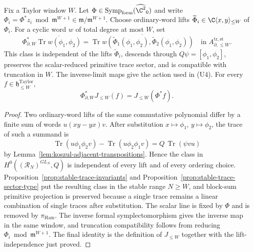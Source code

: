 \documentclass[11pt]{memoir}
\begin{document}
\begin{lem}
\label{lem:formal-darboux-action-trace-sector}
  Fix a Taylor window \(W\).  Let
  \(\Phi\in\operatorname{Symp}_{\mathrm{form}}(\widehat{\C^2}_0)\)
  and write
  \(\Phi_i=\Phi^*z_i\bmod\mathfrak m^{W+1}\in
  \mathfrak m/\mathfrak m^{W+1}\).  Choose ordinary-word lifts
  \(\widetilde\Phi_i\in\C\langle x,y\rangle_{\le W}\) of
  \(\Phi_i\).  For a cyclic word \(w\) of total degree at most \(W\),
  set
  \[
    \Phi^*_{\partial,W}
    \overline{\operatorname{Tr}w(\phi_1,\phi_2)}
    =
    \overline{\operatorname{Tr}
      w(\widetilde\Phi_1(\phi_1,\phi_2),
        \widetilde\Phi_2(\phi_1,\phi_2))}
      \quad \text{in }
      A_{\partial,\le W}^{\mathrm{tr,st}} .
  \]
  This class is independent of the lifts \(\widetilde\Phi_i\), descends
  through \(Q\psi=[\phi_1,\phi_2]\), preserves the scalar-reduced
  primitive trace sector, and is compatible with truncation in \(W\).
  The inverse-limit maps give the action used in \textup{(U4)}.  For
  every \(f\in\mathfrak h^{\mathrm{Taylor}}_{\le W}\),
  \[
    \Phi^*_{\partial,W}J_{\le W}(f)=J_{\le W}(\Phi^*f).
  \]
\end{lem}

\begin{proof}
  Two ordinary-word lifts of the same commutative polynomial differ by a
  finite sum of words \(u(xy-yx)v\).  After substitution
  \(x\mapsto\phi_1\), \(y\mapsto\phi_2\), the trace of such a summand is
  \[
    \operatorname{Tr}(u\phi_1\phi_2v)
    -\operatorname{Tr}(u\phi_2\phi_1v)
    =
    Q\,\operatorname{Tr}(\psi vu)
  \]
  by Lemma~\ref{lem:koszul-adjacent-transpositions}.  Hence the class in
  \(H^0((\mathcal R_N)^{GL_N},Q)\) is independent of every lift and of
  every ordering choice.  Proposition~\ref{prop:stable-trace-invariants}
  and Proposition~\ref{prop:stable-trace-sector-type} put the resulting
  class in the stable range \(N\ge W\), and block-sum primitive
  projection is preserved because a single trace remains a linear
  combination of single traces after substitution.  The scalar line is
  fixed by \(\Phi\) and is removed by \(\pi_{\mathrm{Ham}}\).  The inverse
  formal symplectomorphism gives the inverse map in the same window, and
  truncation compatibility follows from reducing
  \(\Phi_i\bmod\mathfrak m^{W+1}\).  The final identity is the definition
  of \(J_{\le W}\) together with the lift-independence just proved.
\end{proof}
\end{document}

